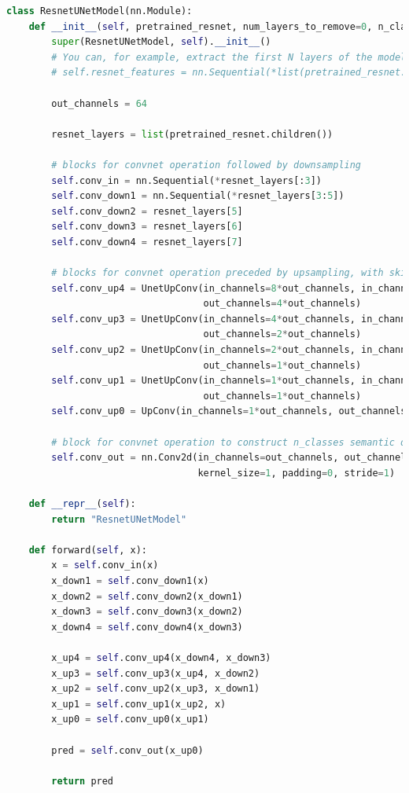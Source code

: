 \documentclass[11pt]{article}
\begin{document}
\begin{lstlisting}[language=Python, basicstyle=\scriptsize]
    class ResnetUNetModel(nn.Module):
    def __init__(self, pretrained_resnet, num_layers_to_remove=0, n_classes=9):
        super(ResnetUNetModel, self).__init__()
        # You can, for example, extract the first N layers of the model like this:
        # self.resnet_features = nn.Sequential(*list(pretrained_resnet.children())[:N])
        
        out_channels = 64

        resnet_layers = list(pretrained_resnet.children())

        # blocks for convnet operation followed by downsampling
        self.conv_in = nn.Sequential(*resnet_layers[:3])              
        self.conv_down1 = nn.Sequential(*resnet_layers[3:5])          
        self.conv_down2 = resnet_layers[5]                            
        self.conv_down3 = resnet_layers[6]                            
        self.conv_down4 = resnet_layers[7]                            

        # blocks for convnet operation preceded by upsampling, with skip connection
        self.conv_up4 = UnetUpConv(in_channels=8*out_channels, in_channels_skip=4*out_channels, 
                                   out_channels=4*out_channels)     
        self.conv_up3 = UnetUpConv(in_channels=4*out_channels, in_channels_skip=2*out_channels, 
                                   out_channels=2*out_channels)     
        self.conv_up2 = UnetUpConv(in_channels=2*out_channels, in_channels_skip=1*out_channels, 
                                   out_channels=1*out_channels)     
        self.conv_up1 = UnetUpConv(in_channels=1*out_channels, in_channels_skip=1*out_channels, 
                                   out_channels=1*out_channels)
        self.conv_up0 = UpConv(in_channels=1*out_channels, out_channels=1*out_channels)       

        # block for convnet operation to construct n_classes semantic outputs
        self.conv_out = nn.Conv2d(in_channels=out_channels, out_channels=n_classes, 
                                  kernel_size=1, padding=0, stride=1)
    
    def __repr__(self):
        return "ResnetUNetModel"        

    def forward(self, x):
        x = self.conv_in(x)
        x_down1 = self.conv_down1(x)
        x_down2 = self.conv_down2(x_down1)
        x_down3 = self.conv_down3(x_down2)
        x_down4 = self.conv_down4(x_down3)

        x_up4 = self.conv_up4(x_down4, x_down3)
        x_up3 = self.conv_up3(x_up4, x_down2)
        x_up2 = self.conv_up2(x_up3, x_down1)
        x_up1 = self.conv_up1(x_up2, x)
        x_up0 = self.conv_up0(x_up1)

        pred = self.conv_out(x_up0)

        return pred
\end{lstlisting}
\end{document}
